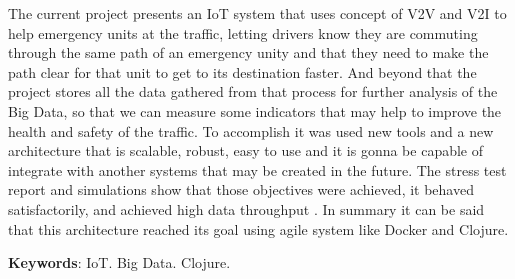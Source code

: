 \setlength{\absparsep}{18pt} %
\begin{resumo}[Abstract]
The current project presents an IoT system that uses concept of V2V and V2I to help emergency units at the traffic, letting drivers know they are commuting through the same path of an emergency unity and that they need to make the path clear for that unit to get to its destination faster. And beyond that the project stores all the data gathered from that process for further analysis of the Big Data, so that we can measure some indicators that may help to improve the health and safety of the traffic. To accomplish it was used new tools and a new architecture that is scalable, robust, easy to use and it is gonna be capable of integrate with another systems that may be created in the future. The stress test report and simulations show that those objectives were achieved, it behaved satisfactorily, and achieved high data throughput . In summary it can be said that this architecture reached its goal using agile system like Docker and Clojure.

 \textbf{Keywords}: IoT. Big Data. Clojure.
\end{resumo}